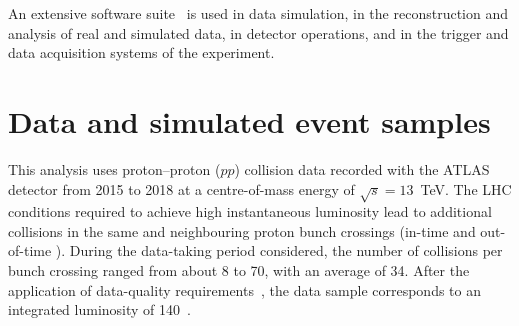 \documentclass[cernpreprint, atlasdraft=false, texlive=2023, UKenglish, texmf, orcidlogo]{atlasdoc}
\begin{document}
An extensive software suite~\cite{ATL-SOFT-PUB-2021-001} is used in data simulation, in the reconstruction
and analysis of real and simulated data, in detector operations, and in the trigger and data acquisition
systems of the experiment.


 
\section{Data and simulated event samples}
\label{sec:datamc}

 
This analysis uses proton--proton ($pp$) collision data recorded with the ATLAS detector
from 2015 to 2018 at a centre-of-mass energy of $\sqrt{s}=13$~TeV. The
LHC conditions required to achieve high instantaneous luminosity
lead to additional collisions in the same and
neighbouring proton bunch crossings (in-time and out-of-time \pileup). During the
data-taking period considered, the number of collisions per bunch
crossing ranged from about 8 to 70, with an average of 34.
After the application of data-quality
requirements~\cite{DAPR-2018-01}, the data sample corresponds to an
integrated luminosity of 140~\ifb.
 
\end{document}
